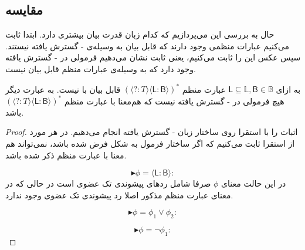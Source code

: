 \subsection{مقایسه}

حال به بررسی این می‌پردازیم که کدام زبان قدرت بیان بیشتری دارد. ابتدا ثابت می‌کنیم عبارات منظمی وجود دارند که قابل بیان به وسیله‌ی - گسترش یافته نیستند. سپس عکس این را ثابت می‌کنیم، یعنی ثابت نشان می‌دهیم فرمولی در - گسترش یافته وجود دارد که به وسیله‌ی عبارات منظم قابل بیان نیست. 

\begin{thm}
	به ازای 
	$\mathsf{L} \subseteq \mathbb{L},\mathsf{B}\in \mathbb{B}$
	عبارت منظم 
	$(\mathsf{\langle ? : \mathit{T} \rangle \langle L:B \rangle })^*$
	قابل بیان با  نیست. به عبارت دیگر هیچ فرمولی در - گسترش یافته نیست که هم‌معنا با عبارت منظم 
	$(\mathsf{\langle ? : \mathit{T} \rangle \langle L:B \rangle })^*$
	 باشد.
\end{thm}

\begin{proof}
	اثبات را با استقرا روی ساختار زبان - گسترش یافته انجام می‌دهیم. در هر مورد از استقرا ثابت می‌کنیم که اگر ساختار فرمول به شکل فرض شده باشد، نمی‌تواند هم معنا با عبارت منظم ذکر شده باشد.
	
	$$\blacktriangleright \phi = \mathsf{\langle L:B \rangle}:$$
	در این حالت معنای $\phi$ صرفا شامل ردهای پیشوندی تک عضوی است در حالی که در معنای عبارت منظم مذکور اصلا رد پیشوندی تک عضوی وجود ندارد.
	
	$$\blacktriangleright \phi = \phi_1 \lor \phi_2:$$
	
	
	$$\blacktriangleright \phi = \neg \phi_1:$$
	
	
	
\end{proof}












